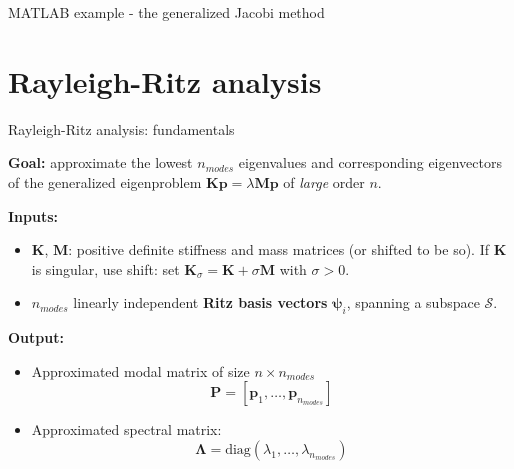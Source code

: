\documentclass[aspectratio=169]{beamer}
\begin{document}
\begin{frame}{MATLAB example - the generalized Jacobi method}
  \begin{center}
    \href{https://drive.mathworks.com/sharing/6a9792ef-d0a7-4aca-a1d0-8b1862b0ac3b}{}
  \end{center}
\end{frame}

\section{Rayleigh-Ritz analysis}

\begin{frame}{Rayleigh-Ritz analysis: fundamentals}
  \begin{block}{}
    \textbf{Goal:} approximate the lowest $n_{modes}$ eigenvalues and corresponding eigenvectors of the generalized eigenproblem \( \mathbf K\mathbf p = \lambda\mathbf M \mathbf p \) of \emph{large} order $n$.
  \end{block}

  \textbf{Inputs:}
  \begin{itemize}
    \item \(\mathbf K \), \(\mathbf M \): positive definite stiffness and mass matrices (or shifted to be so). If $\mathbf K$ is singular, use shift: set \( \mathbf K_\sigma =\mathbf K + \sigma\mathbf M \) with \( \sigma > 0 \).
    \item $n_{modes}$ linearly independent \textbf{Ritz basis vectors} $\boldsymbol{\psi}_i$, spanning a subspace $\mathcal S$.
  \end{itemize}

  \textbf{Output:}
  \begin{itemize}
    \item Approximated modal matrix of size $n\times n_{modes}$
          $$\mathbf P=[\mathbf p_1,\dots,\mathbf p_{n_{modes}}]$$
    \item Approximated spectral matrix: $$\mathbf \Lambda=\text{diag}(\lambda_1,\dots,\lambda_{n_{modes}})$$
  \end{itemize}
\end{frame}
\end{document}
